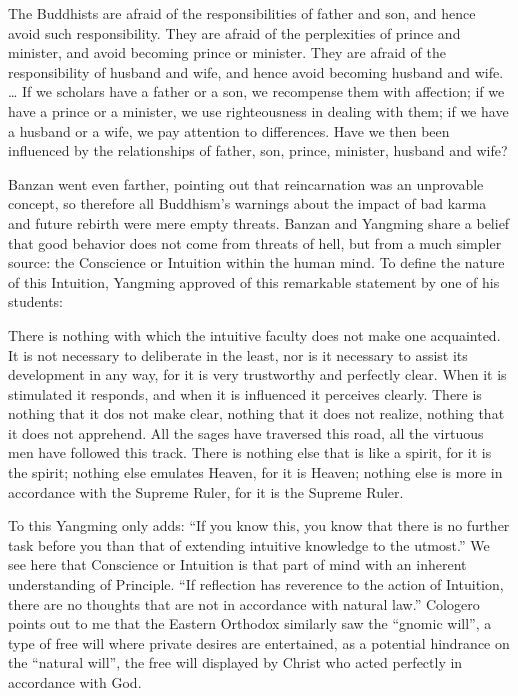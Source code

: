 \begin{quotex}
The Buddhists are afraid of the responsibilities of father and son, and hence avoid such responsibility. They are afraid of the perplexities of prince and minister, and avoid becoming prince or minister. They are afraid of the responsibility of husband and wife, and hence avoid becoming husband and wife. … If we scholars have a father or a son, we recompense them with affection; if we have a prince or a minister, we use righteousness in dealing with them; if we have a husband or a wife, we pay attention to differences. Have we then been influenced by the relationships of father, son, prince, minister, husband and wife?

\end{quotex}
Banzan went even farther, pointing out that reincarnation was an unprovable concept, so therefore all Buddhism's warnings about the impact of bad karma and future rebirth were mere empty threats. Banzan and Yangming share a belief that good behavior does not come from threats of hell, but from a much simpler source: the Conscience or Intuition within the human mind. To define the nature of this Intuition, Yangming approved of this remarkable statement by one of his students:

\begin{quotex}
There is nothing with which the intuitive faculty does not make one acquainted. It is not necessary to deliberate in the least, nor is it necessary to assist its development in any way, for it is very trustworthy and perfectly clear. When it is stimulated it responds, and when it is influenced it perceives clearly. There is nothing that it dos not make clear, nothing that it does not realize, nothing that it does not apprehend. All the sages have traversed this road, all the virtuous men have followed this track. There is nothing else that is like a spirit, for it is the spirit; nothing else emulates Heaven, for it is Heaven; nothing else is more in accordance with the Supreme Ruler, for it is the Supreme Ruler. 

\end{quotex}
To this Yangming only adds: “If you know this, you know that there is no further task before you than that of extending intuitive knowledge to the utmost.” We see here that Conscience or Intuition is that part of mind with an inherent understanding of Principle. “If reflection has reverence to the action of Intuition, there are no thoughts that are not in accordance with natural law.” Cologero points out to me that the Eastern Orthodox similarly saw the “gnomic will”, a type of free will where private desires are entertained, as a potential hindrance on the “natural will”, the free will displayed by Christ who acted perfectly in accordance with God.

